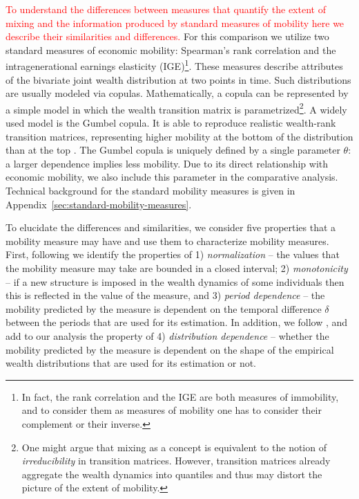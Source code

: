 \documentclass[11pt]{article}
\newcommand{\red}[1]{{\color{red} #1}}
\newcommand{\ie}{{\it i.e.}\xspace}
\numberwithin{equation}{section}
\begin{document}
\textcolor{red}{To understand the differences between measures that quantify the extent of mixing and the information produced by standard measures of mobility here we describe their similarities and differences.} For this comparison we utilize two standard measures of economic mobility: Spearman's rank correlation and the intragenerational earnings elasticity (IGE)\footnote{In fact, the rank correlation and the IGE are both measures of immobility, and to consider them as measures of mobility one has to consider their complement or their inverse.}. These measures describe attributes of the bivariate joint wealth distribution at two points in time. Such distributions are usually modeled via copulas. Mathematically, a copula can be represented by a simple model in which the wealth transition matrix is parametrized\footnote{\red{One might argue that mixing as a concept is equivalent to the notion of \textit{irreducibility} in transition matrices. However, transition matrices already aggregate the wealth dynamics into quantiles and thus may distort the picture of the extent of mobility.}}. A widely used model is the Gumbel copula. It is able to reproduce realistic wealth-rank transition matrices, representing higher mobility at the bottom of the distribution than at the top \citep{JanttiJenkins2015}. The Gumbel copula is uniquely defined by a single parameter $\theta$: a larger dependence implies less mobility. Due to its direct relationship with economic mobility, we also include this parameter in the comparative analysis. Technical background for the standard mobility measures is given in Appendix~\ref{sec:standard-mobility-measures}.

To elucidate the differences and similarities, we consider five properties that a mobility measure may have and use them to characterize mobility measures. First, following \citet{Shorrocks1978} we identify the properties of 1) \textit{normalization} -- the values that the mobility measure may take are bounded in a closed interval; 2) \textit{monotonicity} -- if a new structure is imposed in the wealth dynamics of some individuals then this is reflected in the value of the measure, and 3) \textit{period dependence} -- the mobility predicted by the measure is dependent on the temporal difference $\delta$ between the periods that are used for its estimation. In addition, we follow \citet{cowell2018measuring}, and add to our analysis the property of 4) \textit{distribution dependence} -- whether the mobility predicted by the measure is dependent on the shape of the empirical wealth distributions that are used for its estimation or not. %
\end{document}
